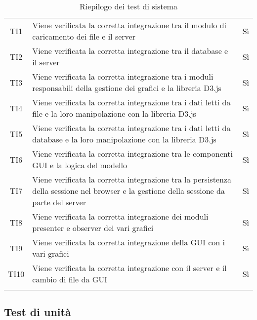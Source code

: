 \documentclass[../piano_di_qualifica.tex]{subfiles}
\begin{document}
\begin{center}
\begin{longtable}{|c|p{10cm}|c|}
		TI1               & Viene verificata la corretta integrazione tra il modulo di caricamento dei file e il server                                              & Sì                         \\
		TI2               & Viene verificata la corretta integrazione tra il database e il server                                                                    & Sì                         \\
		TI3               & Viene verificata la corretta integrazione tra i moduli responsabili della gestione dei grafici e la libreria D3.js                       & Sì                         \\
		TI4               & Viene verificata la corretta integrazione tra i dati letti da file e la loro manipolazione con la libreria D3.js                         & Sì                         \\
		TI5               & Viene verificata la corretta integrazione tra i dati letti da database e la loro manipolazione con la libreria D3.js                     & Sì                         \\
		TI6               & Viene verificata la corretta integrazione tra le componenti GUI e la logica del modello                                                  & Sì                         \\
		TI7               & Viene verificata la corretta integrazione tra la persistenza della sessione nel browser e la gestione della sessione da parte del server & Sì                         \\
		TI8               & Viene verificata la corretta integrazione dei moduli presenter e observer dei vari grafici                                               & Sì                         \\
		TI9               & Viene verificata la corretta integrazione della GUI con i vari grafici                                                                   & Sì                         \\
		TI10              & Viene verificata la corretta integrazione con il server e il cambio di file da GUI                                                       & Sì                         \\

		\hline
		\rowcolor{white}
		\caption{Riepilogo dei test di sistema}
	\end{longtable}
\end{center}

\subsection{Test di unità}%
\label{sub:test_unit}
\end{document}
